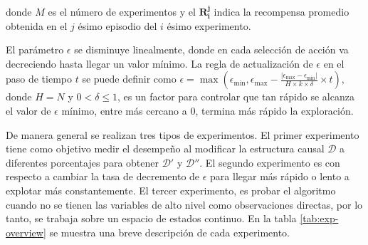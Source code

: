 donde $M$ es el número de experimentos y el $\mathbf{R_i^j}$ indica la recompensa promedio obtenida en el $j$ ésimo episodio del $i$ ésimo experimento.

El parámetro $\epsilon$ se disminuye linealmente, donde
en cada selección de acción va decreciendo hasta llegar
un valor mínimo. La regla de actualización de $\epsilon$ en
el paso de tiempo $t$ se puede definir como $\epsilon = \max(\epsilon_{\min}, \epsilon_{\max} - \frac{|\epsilon_{\max} - \epsilon_{\min}|}{H \times k \times \delta} \times t)$, donde $H=N$ y $0 < \delta \leq 1$, es un factor para controlar
que tan rápido se alcanza el valor de $\epsilon$  mínimo, entre más cercano a 0,
termina más rápido la exploración.

De manera general se realizan tres tipos de experimentos. El primer experimento tiene 
como objetivo medir el desempeño al modificar la estructura causal $\mathcal{D}$ a diferentes porcentajes para obtener $\mathcal{D'}$ y $\mathcal{D}''$. El segundo experimento es con respecto a cambiar la tasa de decremento
de $\epsilon$ para llegar más rápido o lento a explotar 
más constantemente. El tercer experimento, es probar
el algoritmo cuando no se tienen las variables
de alto nivel como observaciones directas, por lo tanto,
se trabaja sobre un espacio de estados continuo. En la tabla \ref{tab:exp-overview} se muestra una breve descripción de cada experimento.

